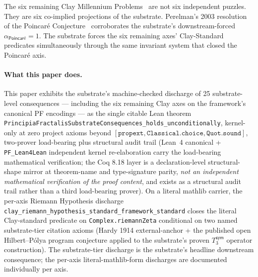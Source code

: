 \documentclass[11pt,a4paper]{amsart}
\theoremstyle{plain}
\theoremstyle{definition}
\begin{document}
The six remaining Clay Millennium Problems~\cite{clay2000} are not six independent puzzles. They are six co-implied projections of the substrate. Perelman's 2003 resolution of the Poincar\'e Conjecture~\cite{perelman2003} corroborates the substrate's downstream-forced $\alpha_{\textsf{Poincar\'e}} = 1$. The substrate forces the six remaining axes' Clay-Standard predicates simultaneously through the same invariant system that closed the Poincar\'e axis.

\paragraph{What this paper does.} This paper exhibits the substrate's machine-checked discharge of 25 substrate-level consequences --- including the six remaining Clay axes on the framework's canonical PF encodings --- as the single citable Lean theorem \texttt{PrincipiaFractalisSubstrateConsequences\_holds\_unconditionally}, kernel-only at zero project axioms beyond $[\texttt{propext}, \texttt{Classical.choice}, \texttt{Quot.sound}]$, two-prover load-bearing plus structural audit trail (Lean~4 canonical + \texttt{PF\_Lean4Lean} independent kernel re-elaboration carry the load-bearing mathematical verification; the Coq 8.18 layer is a declaration-level structural-shape mirror at theorem-name and type-signature parity, \emph{not an independent mathematical verification of the proof content}, and exists as a structural audit trail rather than a third load-bearing prover). On a literal mathlib carrier, the per-axis Riemann Hypothesis discharge \texttt{clay\_riemann\_hypothesis\_standard\_framework\_standard} closes the literal Clay-standard predicate on \texttt{Complex.riemannZeta} conditional on two named substrate-tier citation axioms (Hardy 1914 external-anchor + the published open Hilbert--P\'olya program conjecture applied to the substrate's proven $T_3^{\textsf{sym}}$ operator construction). The substrate-tier discharge is the substrate's headline downstream consequence; the per-axis literal-mathlib-form discharges are documented individually per axis.
\end{document}
